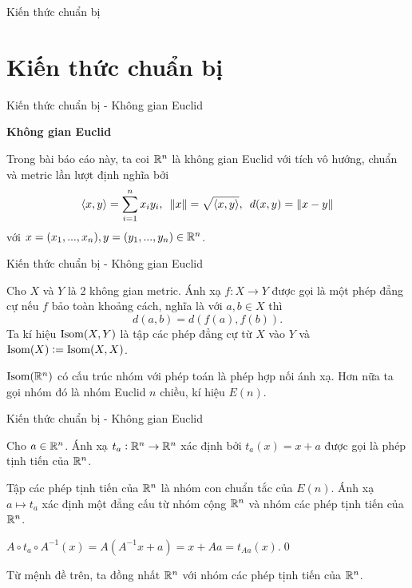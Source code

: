 \begin{frame}{Kiến thức chuẩn bị}
    \section{Kiến thức chuẩn bị}
\end{frame}

\begin{frame}{Kiến thức chuẩn bị - Không gian Euclid}
    \begin{center}
        \Large{\textbf{Không gian Euclid}}
    \end{center}

    Trong bài báo cáo này, ta coi $\mathbb R^n$ là không gian Euclid với tích vô hướng, chuẩn và metric lần lượt định nghĩa bởi
    $$
        \langle x,y \rangle = \sum_{i=1}^n x_i y_i,\enskip \|x\| = \sqrt{\langle x,y \rangle},\enskip d(x,y) = \|x-y\|
    $$
    với $x = (x_1,...,x_n), y = (y_1,...,y_n) \in \mathbb R^n$.
\end{frame}

\begin{frame}{Kiến thức chuẩn bị - Không gian Euclid}
    \begin{define}
        Cho $X$ và $Y$ là 2 không gian metric. Ánh xạ $f: X \rightarrow Y$ được gọi là một \alert{phép đẳng cự} nếu $f$ bảo toàn khoảng cách, nghĩa là với $a,b \in X$ thì
        $$
            d(a,b) = d(f(a),f(b)).
        $$
        Ta kí hiệu $\operatorname{Isom}(X,Y)$ là tập các phép đẳng cự từ $X$ vào $Y$ và $\operatorname{Isom}(X) := \operatorname{Isom}(X,X)$.
    \end{define}
    \begin{proposition}
        $\operatorname{Isom}(\mathbb R^n)$ có cấu trúc nhóm với phép toán là phép hợp nối ánh xạ. Hơn nữa ta gọi nhóm đó là \alert{nhóm Euclid $n$ chiều}, kí hiệu $E(n)$.
    \end{proposition}
\end{frame}

\begin{frame}{Kiến thức chuẩn bị - Không gian Euclid}
    \begin{define}
        Cho $a \in \mathbb R^n$. Ánh xạ $t_a: \mathbb R^n \rightarrow \mathbb R^n$ xác định bởi $t_a(x) = x + a$ được gọi là \alert{phép tịnh tiến} của $\mathbb R^n$.
    \end{define}
    \begin{proposition}
        Tập các phép tịnh tiến của $\mathbb R^n$ là nhóm con chuẩn tắc của $E(n)$. Ánh xạ $a \mapsto t_a$ xác định một đẳng cấu từ nhóm cộng $\mathbb R^n$ và nhóm các phép tịnh tiến của $\mathbb R^n$.
    \end{proposition}
    \startproof $A \circ t_a \circ A^{-1} (x) = A(A^{-1}x + a) = x + Aa = t_{Aa}(x)$.\qed

    Từ mệnh đề trên, ta đồng nhất $\mathbb R^n$ với nhóm các phép tịnh tiến của $\mathbb R^n$.
\end{frame}

